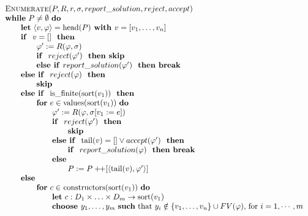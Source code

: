 \documentclass{article}
\newcommand{\concat}{\ensuremath{+\!\!+}}
\begin{document}
\[
\begin{tabular}{l}
\textsc{Enumerate}($P,R,r,\sigma, report\_solution, reject, accept)$ \\
\textbf{while} $P\neq \emptyset $ \textbf{do} \\
\qquad \textbf{let} $\left\langle v,\varphi \right\rangle =\mathrm{head}(P) 
\textbf{ with } v = [v_1, \ldots, v_n]$\\
\qquad \textbf{if } $v = []$ \textbf{ then} \\
\qquad \qquad $\varphi^{\prime}:=R(\varphi,\sigma)$ \\
\qquad \qquad \textbf{if } $reject(\varphi')$ \textbf{ then skip} \\
\qquad \qquad \textbf{else if }$report\_solution(\varphi')$ \textbf{ then break} \\
\qquad \textbf{else if } $reject(\varphi)$ \textbf{ then} \\
\qquad \qquad \textbf{skip} \\
\qquad \textbf{else if } $\mathrm{is\_finite}(\mathrm{sort}(v_{1}))$ \textbf{ then} \\
\qquad \qquad \textbf{for} $e\in \mathrm{values}(\mathrm{sort}(v_{1}))$ \textbf{do} \\
\qquad \qquad \qquad $\varphi^{\prime}:=R(\varphi,\sigma[v_{1}:=e])$ \\
\qquad \qquad \qquad \textbf{if } $reject(\varphi')$ \textbf{ then} \\
\qquad \qquad \qquad \qquad \textbf{skip} \\
\qquad \qquad \qquad \textbf{else if } $\mathrm{tail}(v) = [] \vee accept(\varphi')$ \textbf{ then} \\
\qquad \qquad \qquad \qquad \textbf{if } $report\_solution(\varphi)$ \textbf{ then break} \\
\qquad \qquad \qquad \textbf{else } \\ 
\qquad \qquad \qquad \qquad $P:=P\concat\lbrack \left\langle \mathrm{tail}(v), \varphi' \right\rangle ]$ \\
\qquad \textbf{else } \\
\qquad \qquad \textbf{for} $c\in $ $\mathrm{constructors}(\mathrm{sort}(v_{1}))$ \textbf{do} \\
\qquad \qquad \qquad \textbf{let} $c:D_{1}\times \ldots \times
D_{m}\rightarrow \mathrm{sort}(v_{1})$ \\
\qquad \qquad \qquad \textbf{choose }$y_1,\ldots ,y_m$
\textbf{such} that $y_i \notin \{ v_1, \ldots ,v_n \} \cup FV(\varphi)$, for $i=1, \cdots, m$ \\

\end{tabular}\]
\end{document}
